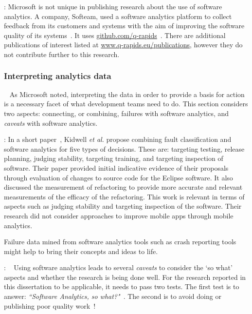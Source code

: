 : 
Microsoft is not unique in publishing research about the use of software analytics. A company, Softeam, used a software analytics platform to collect feedback from its customers and systems with the aim of improving the software quality of its systems~. It uses \href{https://github.com/q-rapids}{github.com/q-rapids}~. There are additional publications of interest listed at \href{https://www.q-rapids.eu/publications}{www.q-rapids.eu/publications}, however they do not contribute further to this research.


\subsubsection{Interpreting analytics data}~\label{rw-interpreting-analytics-data-research}
As Microsoft noted, interpreting the data in order to provide a basis for action is a necessary facet of what development teams need to do. This section considers two aspects: connecting, or combining, failures with software analytics, and \emph{caveats} with software analytics.

: 
In a short paper~, Kidwell \emph{et al.} propose combining fault classification and software analytics for five types of decisions. These are: targeting testing, release planning, judging stability, targeting training, and targeting inspection of software. Their paper provided initial indicative evidence of their proposals through evaluation of changes to source code for the Eclipse software. It also discussed the measurement of refactoring to provide more accurate and relevant measurements of the efficacy of the refactoring. This work is relevant in terms of aspects such as judging stability and targeting inspection of the software. Their research did not consider approaches to improve mobile apps through mobile analytics. 

Failure data mined from software analytics tools such as crash reporting tools might help to bring their concepts and ideas to life.

{}: ~\label{rw-caveats-with-software-analytics-topic}
Using software analytics leads to several \emph{caveats} to consider the `so what' aspects and whether the research is being done well. For the research reported in this dissertation  to be applicable, it needs to pass two tests. The first test is to answer: 
\emph{``Software Analytics, so what?"}~. The second is to avoid doing or publishing poor quality work~!


